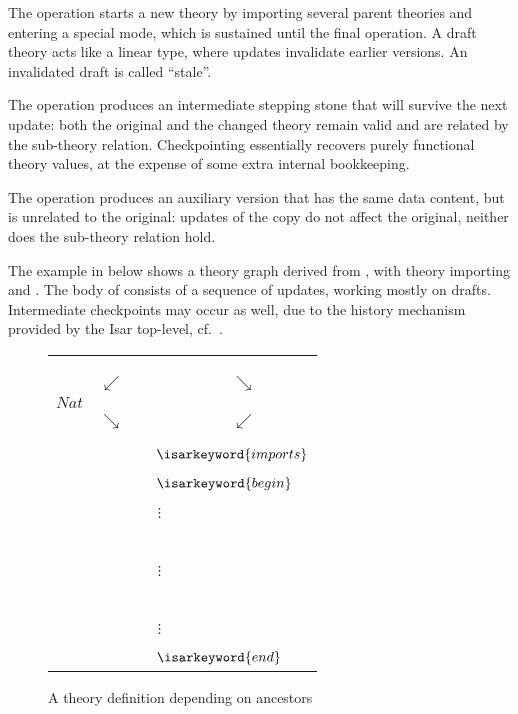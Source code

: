 \begin{isabellebody}
\begin{isamarkuptext}
  The  operation starts a new theory by importing
  several parent theories and entering a special  mode,
  which is sustained until the final  operation.  A draft
  theory acts like a linear type, where updates invalidate earlier
  versions.  An invalidated draft is called ``stale''.

  The  operation produces an intermediate stepping
  stone that will survive the next update: both the original and the
  changed theory remain valid and are related by the sub-theory
  relation.  Checkpointing essentially recovers purely functional
  theory values, at the expense of some extra internal bookkeeping.

  The  operation produces an auxiliary version that has
  the same data content, but is unrelated to the original: updates of
  the copy do not affect the original, neither does the sub-theory
  relation hold.

  \medskip The example in  below shows a theory
  graph derived from , with theory 
  importing  and .  The body of  consists of a sequence of updates, working mostly on
  drafts.  Intermediate checkpoints may occur as well, due to the
  history mechanism provided by the Isar top-level, cf.\
  .

  \begin{figure}[htb]
  \begin{center}
  \begin{tabular}{rcccl}
        &            & \isa{Pure} \\
        &            & \isa{{\isasymdown}} \\
        &            & \isa{FOL} \\
        & $\swarrow$ &              & $\searrow$ & \\
  $Nat$ &            &              &            & \isa{List} \\
        & $\searrow$ &              & $\swarrow$ \\
        &            & \isa{Length} \\
        &            & \multicolumn{3}{l}{~~$\isarkeyword{imports}$} \\
        &            & \multicolumn{3}{l}{~~$\isarkeyword{begin}$} \\
        &            & $\vdots$~~ \\
        &            & \isa{{\isasymbullet}}~~ \\
        &            & $\vdots$~~ \\
        &            & \isa{{\isasymbullet}}~~ \\
        &            & $\vdots$~~ \\
        &            & \multicolumn{3}{l}{~~$\isarkeyword{end}$} \\
  \end{tabular}
  \caption{A theory definition depending on ancestors}\label{fig:ex-theory}
  \end{center}
  \end{figure}


\end{isamarkuptext}
\end{isabellebody}

